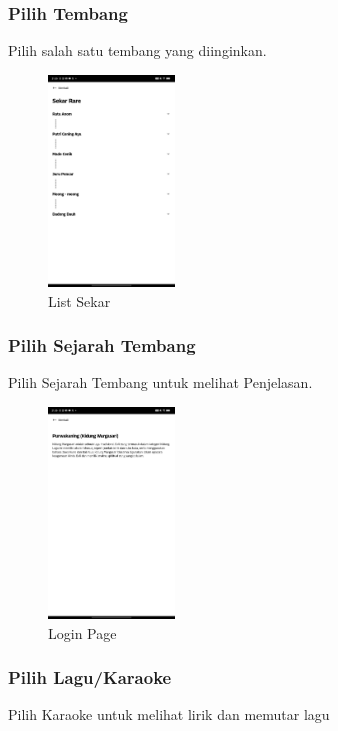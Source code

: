 \subsubsection{Pilih Tembang}
Pilih salah satu tembang yang diinginkan.

\begin{figure}[H]
    \centering
    \includegraphics[width=0.3\textwidth]{assets/list-rare.jpg}
    \caption{List Sekar}
\end{figure}

\subsubsection{Pilih Sejarah Tembang}
Pilih Sejarah Tembang untuk melihat Penjelasan.

\begin{figure}[H]
    \centering
    \includegraphics[width=0.3\textwidth]{assets/explanation.jpg}
    \caption{Login Page}
\end{figure}

\subsubsection{Pilih Lagu/Karaoke}
Pilih Karaoke untuk melihat lirik dan memutar lagu


